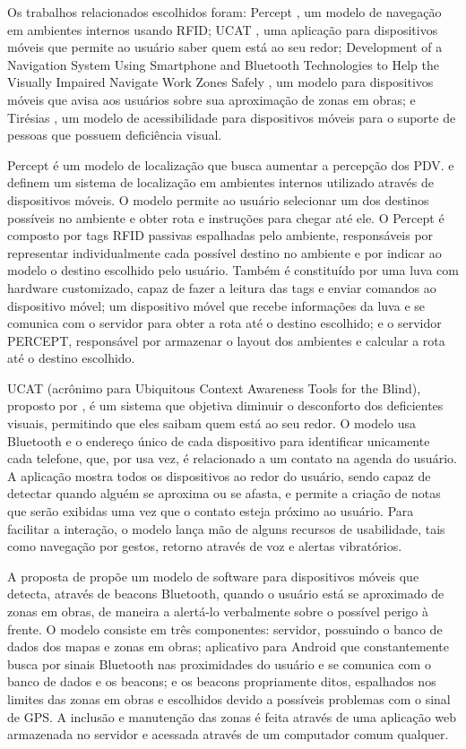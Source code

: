 \documentclass[twoside,english,brazilian]{UNISINOSartigo}
\begin{document}
Os trabalhos relacionados escolhidos foram: Percept \cite{Ganz2011, Ganz2012}, um modelo de navegação em ambientes internos usando RFID; UCAT \cite{ucat2014}, uma aplicação para dispositivos móveis que permite ao usuário saber quem está ao seu redor; Development of a Navigation System Using Smartphone and Bluetooth Technologies to Help the Visually Impaired Navigate Work Zones Safely \cite{chen2014}, um modelo para dispositivos móveis que avisa aos usuários sobre sua aproximação de zonas em obras; e Tirésias \cite{Falk2013}, um modelo de acessibilidade para dispositivos móveis para o suporte de pessoas que possuem deficiência visual.

Percept é um modelo de localização que busca aumentar a percepção dos PDV.  e  definem um sistema de localização em ambientes internos utilizado através de dispositivos móveis. O modelo permite ao usuário selecionar um dos destinos possíveis no ambiente e obter rota e instruções para chegar até ele. O Percept é composto por tags RFID passivas espalhadas pelo ambiente, responsáveis por representar individualmente cada possível destino no ambiente e por indicar ao modelo o destino escolhido pelo usuário. Também é constituído por uma luva com hardware customizado, capaz de fazer a leitura das tags e enviar comandos ao dispositivo móvel; um dispositivo móvel que recebe informações da luva e se comunica com o servidor para obter a rota até o destino escolhido; e o servidor PERCEPT, responsável por armazenar o layout dos ambientes e calcular a rota até o destino escolhido.

UCAT (acrônimo para Ubiquitous Context Awareness Tools for the Blind), proposto por , é um sistema que objetiva diminuir o desconforto dos deficientes visuais, permitindo que eles saibam quem está ao seu redor. O modelo usa Bluetooth e o endereço único de cada dispositivo para identificar unicamente cada telefone, que, por usa vez, é relacionado a um contato na agenda do usuário. A aplicação mostra todos os dispositivos ao redor do usuário, sendo capaz de detectar quando alguém se aproxima ou se afasta, e permite a criação de notas que serão exibidas uma vez que o contato esteja próximo ao usuário. Para facilitar a interação, o modelo lança mão de alguns recursos de usabilidade, tais como navegação por gestos, retorno através de voz e alertas vibratórios.

A proposta de  propõe um modelo de software para dispositivos móveis que detecta, através de beacons Bluetooth, quando o usuário está se aproximado de zonas em obras, de maneira a alertá-lo verbalmente sobre o possível perigo à frente. O modelo consiste em três componentes: servidor, possuindo o banco de dados dos mapas e zonas em obras; aplicativo para Android que constantemente busca por sinais Bluetooth nas proximidades do usuário e se comunica com o banco de dados e os beacons; e os beacons propriamente ditos, espalhados nos limites das zonas em obras e escolhidos devido a possíveis problemas com o sinal de GPS. A inclusão e manutenção das zonas é feita através de uma aplicação web armazenada no servidor e acessada através de um computador comum qualquer.
\end{document}
